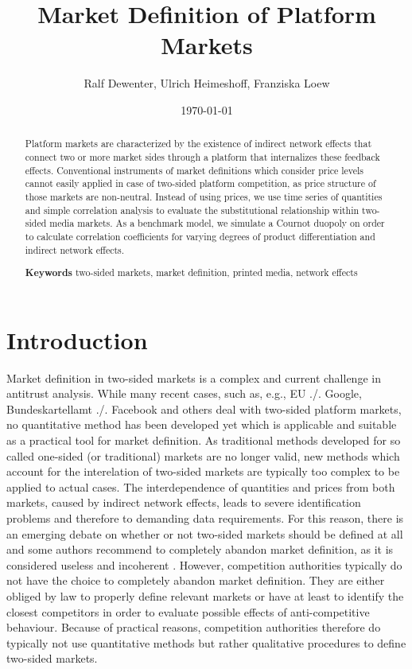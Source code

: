 \documentclass[12pt,a4paper,notitlepage]{article}
\title{Market Definition of Platform Markets}
\date{\today}
\author{Ralf Dewenter, Ulrich Heimeshoff, Franziska Loew}
\begin{document}
\begin{titlepage}
	\maketitle
	\begin{abstract}
		Platform markets are characterized by the existence of indirect network effects that connect two or more market sides through a platform that internalizes these feedback effects. Conventional instruments of market definitions which consider price levels cannot easily applied in case of two-sided platform competition, as price structure of those markets are non-neutral. Instead of using prices, we use time series of quantities and simple correlation analysis to evaluate the substitutional relationship within two-sided media markets. As a benchmark model, we simulate a Cournot duopoly on order to calculate correlation coefficients for varying degrees of product differentiation and indirect network effects.
		
		\textbf{Keywords} two-sided markets, market definition, printed media, network effects

	\end{abstract}

\end{titlepage}
\setcounter{page}{2}

\section{Introduction}

Market definition in two-sided markets is a complex and current challenge in antitrust analysis. While many recent cases, such as, e.g., EU ./. Google, Bundeskartellamt ./. Facebook and others deal with two-sided platform markets, no quantitative method has been developed yet which is applicable and suitable as a practical tool for market definition. As traditional methods developed for so called one-sided (or traditional) markets are no longer valid, new methods which account for the interelation of two-sided markets are typically too complex to be applied to actual cases. The interdependence of quantities and prices from both markets, caused by indirect network effects, leads to severe identification problems and therefore to demanding data requirements. For this reason, there is an emerging debate on whether or not two-sided markets should be defined at all and some authors recommend to completely abandon market definition, as it is considered useless and incoherent \citep{noel_analyzing_2005}. However, competition authorities typically do not have the choice to completely abandon market definition. They are either obliged by law to properly define relevant markets or have at least to identify the closest competitors in order to evaluate possible effects of anti-competitive behaviour. Because of practical reasons, competition authorities therefore do typically not use quantitative methods but rather qualitative procedures to define two-sided markets.   
\end{document}
